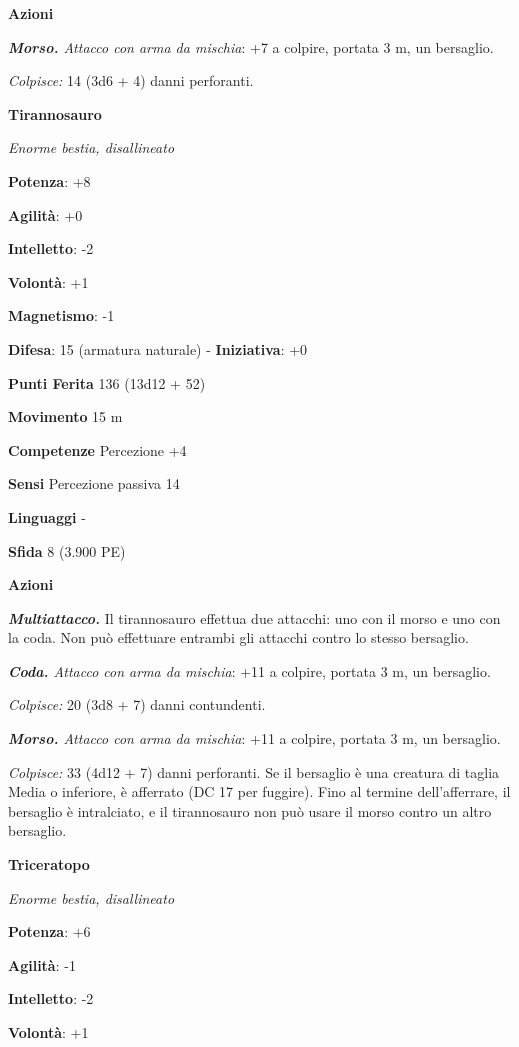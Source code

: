 \begin{multicols}{2}
\textbf{Azioni}

\emph{\textbf{Morso.} Attacco con arma da mischia}: +7 a colpire,
portata 3 m, un bersaglio.

\emph{Colpisce:} 14 (3d6 + 4) danni perforanti.

\textbf{Tirannosauro}

\emph{Enorme bestia, disallineato}

\textbf{Potenza}: +8

\textbf{Agilità}: +0

\textbf{Intelletto}: -2

\textbf{Volontà}: +1

\textbf{Magnetismo}: -1

\textbf{Difesa}: 15 (armatura naturale) - \textbf{Iniziativa}: +0

\textbf{Punti Ferita} 136 (13d12 + 52)

\textbf{Movimento} 15 m

\textbf{Competenze} Percezione +4

\textbf{Sensi} Percezione passiva 14

\textbf{Linguaggi} -

\textbf{Sfida} 8 (3.900 PE)

\textbf{Azioni}

\emph{\textbf{Multiattacco.}} Il tirannosauro effettua due attacchi: uno
con il morso e uno con la coda. Non può effettuare entrambi gli attacchi
contro lo stesso bersaglio.

\emph{\textbf{Coda.} Attacco con arma da mischia}: +11 a colpire,
portata 3 m, un bersaglio.

\emph{Colpisce:} 20 (3d8 + 7) danni contundenti.

\emph{\textbf{Morso.} Attacco con arma da mischia}: +11 a colpire,
portata 3 m, un bersaglio.

\emph{Colpisce:} 33 (4d12 + 7) danni perforanti. Se il bersaglio è una
creatura di taglia Media o inferiore, è afferrato (DC 17 per fuggire).
Fino al termine dell'afferrare, il bersaglio è intralciato, e il
tirannosauro non può usare il morso contro un altro bersaglio.

\textbf{Triceratopo}

\emph{Enorme bestia, disallineato}

\textbf{Potenza}: +6

\textbf{Agilità}: -1

\textbf{Intelletto}: -2

\textbf{Volontà}: +1


\end{multicols}
